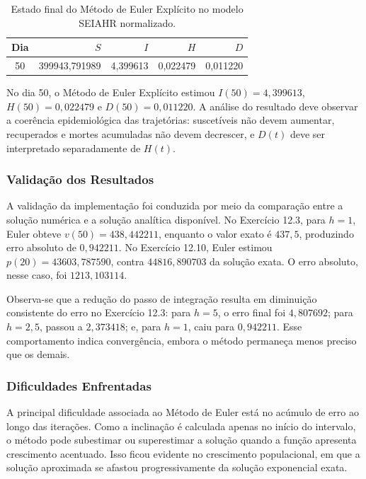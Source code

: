 \begin{table}[H]
    \centering
    \caption{Estado final do Método de Euler Explícito no modelo SEIAHR normalizado.}
    \begin{tabular}{c|r|r|r|r}
        \textbf{Dia} & \textbf{\(S\)} & \textbf{\(I\)} & \textbf{\(H\)} & \textbf{\(D\)} \\
        \hline
        50 & 399943{,}791989 & 4{,}399613 & 0{,}022479 & 0{,}011220 \\
    \end{tabular}
\end{table}

No dia 50, o Método de Euler Explícito estimou \(I(50)=4{,}399613\), \(H(50)=0{,}022479\) e \(D(50)=0{,}011220\). A análise do resultado deve observar a coerência epidemiológica das trajetórias: suscetíveis não devem aumentar, recuperados e mortes acumuladas não devem decrescer, e \(D(t)\) deve ser interpretado separadamente de \(H(t)\).

\subsubsection{Validação dos Resultados}

A validação da implementação foi conduzida por meio da comparação entre a solução numérica e a solução analítica disponível. No Exercício 12.3, para \(h=1\), Euler obteve \(v(50)=438{,}442211\), enquanto o valor exato é \(437{,}5\), produzindo erro absoluto de \(0{,}942211\). No Exercício 12.10, Euler estimou \(p(20)=43603{,}787590\), contra \(44816{,}890703\) da solução exata. O erro absoluto, nesse caso, foi \(1213{,}103114\).

Observa-se que a redução do passo de integração resulta em diminuição consistente do erro no Exercício 12.3: para \(h=5\), o erro final foi \(4{,}807692\); para \(h=2{,}5\), passou a \(2{,}373418\); e, para \(h=1\), caiu para \(0{,}942211\). Esse comportamento indica convergência, embora o método permaneça menos preciso que os demais.

\subsubsection{Dificuldades Enfrentadas}

A principal dificuldade associada ao Método de Euler está no acúmulo de erro ao longo das iterações. Como a inclinação é calculada apenas no início do intervalo, o método pode subestimar ou superestimar a solução quando a função apresenta crescimento acentuado. Isso ficou evidente no crescimento populacional, em que a solução aproximada se afastou progressivamente da solução exponencial exata.

